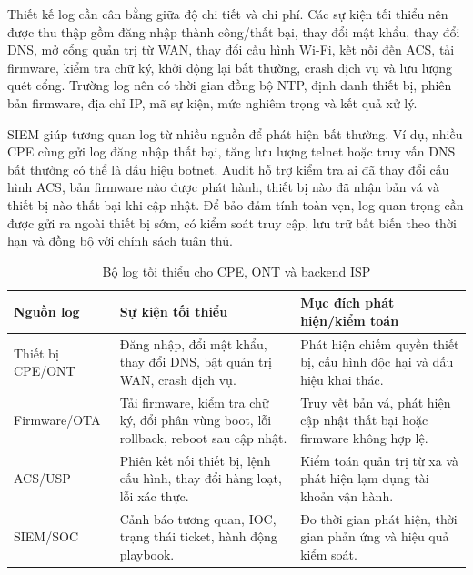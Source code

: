 \documentclass[../DoAn.tex]{subfiles}
\begin{document}
Thiết kế log cần cân bằng giữa độ chi tiết và chi phí. Các sự kiện tối thiểu nên được thu thập gồm đăng nhập thành công/thất bại, thay đổi mật khẩu, thay đổi DNS, mở cổng quản trị từ WAN, thay đổi cấu hình Wi-Fi, kết nối đến ACS, tải firmware, kiểm tra chữ ký, khởi động lại bất thường, crash dịch vụ và lưu lượng quét cổng. Trường log nên có thời gian đồng bộ NTP, định danh thiết bị, phiên bản firmware, địa chỉ IP, mã sự kiện, mức nghiêm trọng và kết quả xử lý.

SIEM giúp tương quan log từ nhiều nguồn để phát hiện bất thường. Ví dụ, nhiều CPE cùng gửi log đăng nhập thất bại, tăng lưu lượng telnet hoặc truy vấn DNS bất thường có thể là dấu hiệu botnet. Audit hỗ trợ kiểm tra ai đã thay đổi cấu hình ACS, bản firmware nào được phát hành, thiết bị nào đã nhận bản vá và thiết bị nào thất bại khi cập nhật. Để bảo đảm tính toàn vẹn, log quan trọng cần được gửi ra ngoài thiết bị sớm, có kiểm soát truy cập, lưu trữ bất biến theo thời hạn và đồng bộ với chính sách tuân thủ.

\begin{table}[H]
\centering
\begin{tabular}{|p{3.2cm}|p{4.5cm}|p{5.1cm}|}
\hline
\textbf{Nguồn log} & \textbf{Sự kiện tối thiểu} & \textbf{Mục đích phát hiện/kiểm toán} \\ \hline
Thiết bị CPE/ONT & Đăng nhập, đổi mật khẩu, thay đổi DNS, bật quản trị WAN, crash dịch vụ. & Phát hiện chiếm quyền thiết bị, cấu hình độc hại và dấu hiệu khai thác. \\ \hline
Firmware/OTA & Tải firmware, kiểm tra chữ ký, đổi phân vùng boot, lỗi rollback, reboot sau cập nhật. & Truy vết bản vá, phát hiện cập nhật thất bại hoặc firmware không hợp lệ. \\ \hline
ACS/USP & Phiên kết nối thiết bị, lệnh cấu hình, thay đổi hàng loạt, lỗi xác thực. & Kiểm toán quản trị từ xa và phát hiện lạm dụng tài khoản vận hành. \\ \hline
SIEM/SOC & Cảnh báo tương quan, IOC, trạng thái ticket, hành động playbook. & Đo thời gian phát hiện, thời gian phản ứng và hiệu quả kiểm soát. \\ \hline
\end{tabular}
\caption{Bộ log tối thiểu cho CPE, ONT và backend ISP}
\label{tab:minimal-log-set}
\end{table}
\end{document}
